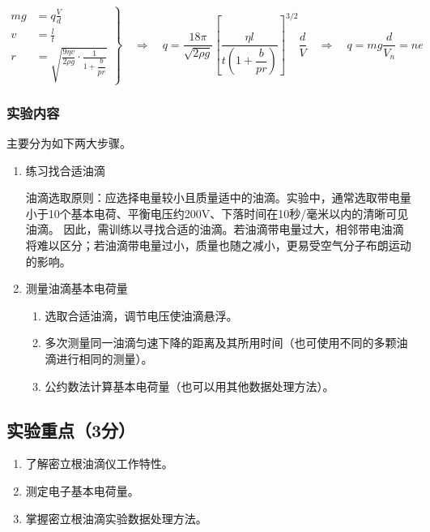 \documentclass[10pt,a4paper]{ctexart} %
\begin{document}
    \[
    \left.
    \begin{aligned}
    mg &= q\frac{V}{d} \\[1em]
    v &= \frac{l}{t} \\[1em]
    r &= \sqrt{
        \frac{9\eta v}{2\rho g}
        \cdot
        \frac{1}{1+\dfrac{b}{pr}}
    }
    \end{aligned}
    \right\}
    \quad\Longrightarrow\quad
    q = \frac{18\pi}{\sqrt{2\rho g}}
        \left[
            \frac{\eta l}{t\left(1+\dfrac{b}{pr}\right)}
        \right]^{3/2}
        \frac{d}{V}
    \quad\Longrightarrow\quad
    q = mg\frac{d}{V_n} = ne
    \]

    \subsubsection{实验内容}
    主要分为如下两大步骤。
    \begin{enumerate}
      \item 练习找合适油滴
      
      油滴选取原则：应选择电量较小且质量适中的油滴。实验中，通常选取带电量小于10个基本电荷、平衡电压约200V、下落时间在10秒/毫米以内的清晰可见油滴。
      因此，需训练以寻找合适的油滴。若油滴带电量过大，相邻带电油滴将难以区分；若油滴带电量过小，质量也随之减小，更易受空气分子布朗运动的影响。
      
      \item 测量油滴基本电荷量
      \begin{enumerate}
         \item 选取合适油滴，调节电压使油滴悬浮。
         \item 多次测量同一油滴匀速下降的距离及其所用时间（也可使用不同的多颗油滴进行相同的测量）。
         \item 公约数法计算基本电荷量（也可以用其他数据处理方法）。
      \end{enumerate}
    \end{enumerate} 

  \subsection{实验重点（3分）}
  \begin{enumerate}
    \item 了解密立根油滴仪工作特性。
    \item 测定电子基本电荷量。
    \item 掌握密立根油滴实验数据处理方法。
  \end{enumerate}
\end{document}
